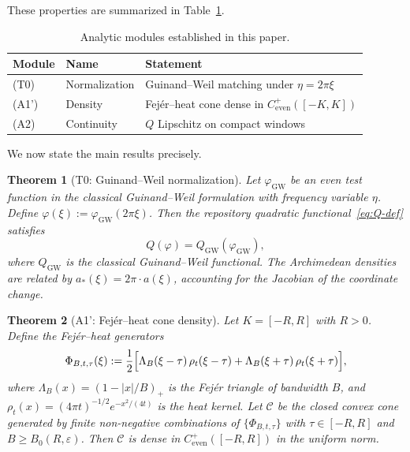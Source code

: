 \documentclass[11pt,a4paper]{article}
\newtheorem{theorem}{Theorem}[section]
\theoremstyle{definition}
\theoremstyle{remark}
\begin{document}
These properties are summarized in Table~\ref{tab:modules}.

\begin{table}[h]
\centering
\caption{Analytic modules established in this paper.}
\label{tab:modules}
\begin{tabular}{@{}llp{7cm}@{}}
\toprule
Module & Name & Statement \\
\midrule
(T0) & Normalization & Guinand--Weil matching under $\eta = 2\pi\xi$ \\
(A1') & Density & Fej\'er--heat cone dense in $C^+_{\mathrm{even}}([-K,K])$ \\
(A2) & Continuity & $Q$ Lipschitz on compact windows \\
\bottomrule
\end{tabular}
\end{table}

We now state the main results precisely.

\begin{theorem}[T0: Guinand--Weil normalization]\label{thm:T0}
Let $\varphi_{\mathrm{GW}}$ be an even test function in the classical Guinand--Weil formulation with frequency variable $\eta$. Define $\varphi(\xi) := \varphi_{\mathrm{GW}}(2\pi\xi)$. Then the repository quadratic functional~\eqref{eq:Q-def} satisfies
\begin{equation}\label{eq:T0-match}
  Q(\varphi) = Q_{\mathrm{GW}}(\varphi_{\mathrm{GW}}),
\end{equation}
where $Q_{\mathrm{GW}}$ is the classical Guinand--Weil functional. The Archimedean densities are related by $a_*(\xi) = 2\pi \cdot a(\xi)$, accounting for the Jacobian of the coordinate change.
\end{theorem}

\begin{theorem}[A1': Fej\'er--heat cone density]\label{thm:A1}
Let $K = [-R, R]$ with $R > 0$. Define the Fej\'er--heat generators
\begin{equation}\label{eq:Phi-gen}
  \Phi_{B,t,\tau}(\xi) := \frac{1}{2}\Bigl[\Lambda_B(\xi - \tau)\, \rho_t(\xi - \tau) + \Lambda_B(\xi + \tau)\, \rho_t(\xi + \tau)\Bigr],
\end{equation}
where $\Lambda_B(x) = (1 - |x|/B)_+$ is the Fej\'er triangle of bandwidth $B$, and $\rho_t(x) = (4\pi t)^{-1/2} e^{-x^2/(4t)}$ is the heat kernel. Let $\mathcal{C}$ be the closed convex cone generated by finite non-negative combinations of $\{\Phi_{B,t,\tau}\}$ with $\tau \in [-R, R]$ and $B \geq B_0(R, \varepsilon)$. Then $\mathcal{C}$ is dense in $C^+_{\mathrm{even}}([-R,R])$ in the uniform norm.
\end{theorem}
\end{document}
